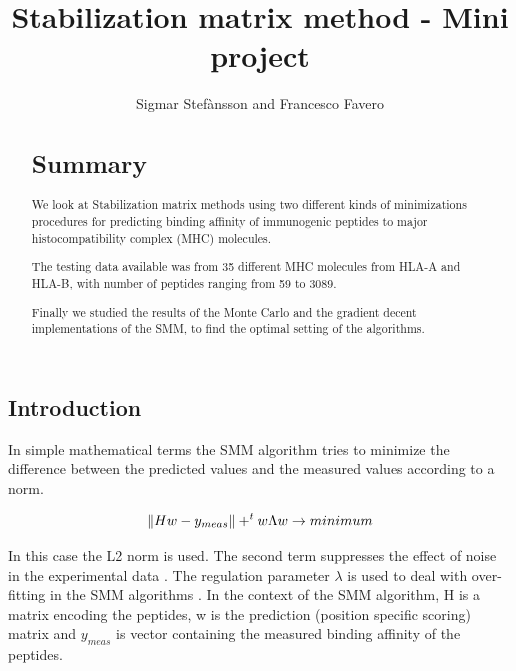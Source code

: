 \documentclass{bioinfo}
\begin{document}
\begin{application}

\title[SMM Project]{Stabilization matrix method - Mini project}
\author[Sigmar Stef\`{a}nsson, Francesco Favero]{Sigmar Stef\`{a}nsson and Francesco Favero}
\address{Danmarks Tekniske Univeristet}



\maketitle

\begin{abstract}

\section{Summary}
We look at Stabilization matrix methods using two different kinds of minimizations procedures \cite{SMM} for predicting binding \cite{netMHC} affinity of immunogenic peptides to major histocompatibility complex \cite{wiki:MHC} (MHC) molecules.
\par The testing data available was from 35 different MHC molecules from HLA-A and HLA-B, with number of peptides ranging from 59 to 3089.
\par Finally we studied the results of the Monte Carlo and the gradient decent implementations of the SMM, to find the optimal setting of the algorithms.

\end{abstract}

\section*{Introduction}

In simple mathematical terms the SMM algorithm tries to minimize the difference between the predicted values and the measured values according to a norm.

\begin{equation}
\label{eq:01}
\| H w - y_{meas}\| + ^tw \Lambda w \rightarrow minimum \\
\end{equation}

In this case the L2 norm is used. The second term suppresses the effect of noise in the experimental data \cite{SMM}. The regulation parameter $\lambda$ is used to deal with over-fitting in the SMM algorithms \cite{wiki:overfit}. In the context of the SMM algorithm, H is a matrix encoding the peptides, w is the prediction (position specific scoring) matrix and $y_{meas}$ is vector containing the measured binding affinity of the peptides.


\end{application}
\end{document}
